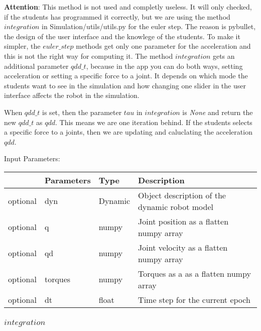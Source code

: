 \documentclass[
	ngerman,
	accentcolor=9c,%
	type=intern,
	marginpar=false
	]{tudapub}
\begin{document}
\vspace{0.2cm}
\noindent \textbf{Attention}: This method is not used and completly useless. It will only checked, if the students has programmed it correctly, but we are using the method $integration$ in Simulation/utils/utils.py for the euler step. The reason is pybullet, the design of the user interface and the knowlege of the students. To make it simpler, the $euler\_step$ methods get only one parameter for the acceleration and this is not the right way for computing it. The method $integration$ gets an additional parameter $qdd\_t$, because in the app you can do both ways, setting acceleration or setting a specific force to a joint. It depends on which mode the students want to see in the simulation and how changing one slider in the user interface affects the robot in the simulation.

\vspace{0.2cm}
\noindent When $qdd\_t$ is set, then the parameter $tau$ in $integration$ is \textit{None} and return the new $qdd\_t$ as $qdd$. This means we are one iteration behind. If the students selects a specific force to a joints, then we are updating and caluclating the acceleration $qdd$.  

\vspace{0.5cm}
\noindent Input Parameters:
\vspace{0.5cm}

\begin{tabular}{|p{}|p{}|p{}| p{}|}
\hline
 & \textbf{Parameters} & \textbf{Type} & \textbf{Description} \\
\hline
optional & dyn & Dynamic & Object description of the dynamic robot model \\
\hline
optional & q & numpy & Joint position as a flatten numpy array \\
\hline
optional & qd & numpy & Joint velocity as a flatten numpy array \\
\hline
optional & torques & numpy & Torques as a as a flatten numpy array \\
\hline
optional & dt & float & Time step for the current epoch \\
\hline
\end{tabular}

\vspace{0.5cm}

\subsubsection{$integration$}
\end{document}

